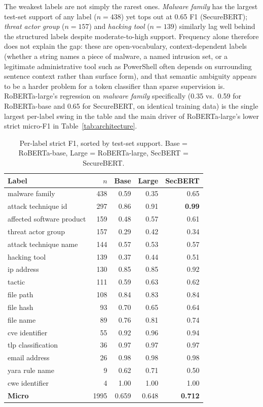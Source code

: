 \documentclass[11pt]{article}
\begin{document}
The weakest labels are not simply the rarest ones. \emph{Malware family}
has the largest test-set support of any label ($n=438$) yet tops out at
0.65 F1 (SecureBERT); \emph{threat actor group} ($n=157$) and \emph{hacking
tool} ($n=139$) similarly lag well behind the structured labels despite
moderate-to-high support. Frequency alone therefore does not explain the
gap: these are open-vocabulary, context-dependent labels (whether a string
names a piece of malware, a named intrusion set, or a legitimate
administrative tool such as PowerShell often depends on surrounding
sentence context rather than surface form), and that semantic ambiguity
appears to be a harder problem for a token classifier than sparse
supervision is. RoBERTa-large's regression on \emph{malware family}
specifically (0.35 vs.\ 0.59 for RoBERTa-base and 0.65 for SecureBERT, on
identical training data) is the single largest per-label swing in the table
and the main driver of RoBERTa-large's lower strict micro-F1 in
Table~\ref{tab:architecture}.

\begin{table}[t]
\centering
\small
\setlength{\tabcolsep}{3pt}
\begin{tabular}{lrrrr}
\toprule
Label & $n$ & Base & Large & SecBERT \\
\midrule
malware family             & 438 & 0.59 & 0.35 & 0.65 \\
attack technique id        & 297 & 0.86 & 0.91 & \textbf{0.99} \\
affected software product  & 159 & 0.48 & 0.57 & 0.61 \\
threat actor group         & 157 & 0.29 & 0.42 & 0.34 \\
attack technique name      & 144 & 0.57 & 0.53 & 0.57 \\
hacking tool                & 139 & 0.37 & 0.44 & 0.51 \\
ip address                 & 130 & 0.85 & 0.85 & 0.92 \\
tactic                     & 111 & 0.59 & 0.63 & 0.62 \\
file path                  & 108 & 0.84 & 0.83 & 0.84 \\
file hash                  &  93 & 0.70 & 0.65 & 0.64 \\
file name                  &  89 & 0.76 & 0.81 & 0.74 \\
cve identifier              &  55 & 0.92 & 0.96 & 0.94 \\
tlp classification         &  36 & 0.97 & 0.97 & 0.97 \\
email address              &  26 & 0.98 & 0.98 & 0.98 \\
yara rule name              &   9 & 0.62 & 0.71 & 0.50 \\
cwe identifier               &   4 & 1.00 & 1.00 & 1.00 \\
\midrule
\textbf{Micro} & 1995 & 0.659 & 0.648 & \textbf{0.712} \\
\bottomrule
\end{tabular}
\caption{Per-label strict F1, sorted by test-set support. Base =
RoBERTa-base, Large = RoBERTa-large, SecBERT = SecureBERT.}
\label{tab:per-label}
\end{table}
\end{document}
